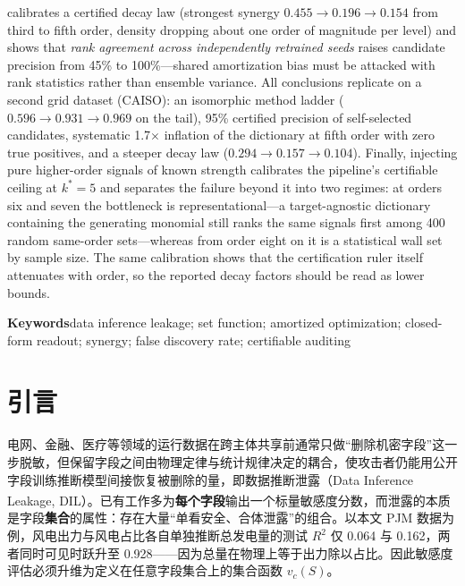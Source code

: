 \documentclass[10.5pt,compsoc,UTF8]{CjC}
\theoremstyle{mystyle}
\newcommand{\upcite}[1]{\textsuperscript{\cite{#1}}}
\newcommand{\Rtwo}{R^{2}}
\begin{document}
{{calibrates a certified decay law (strongest synergy $0.455\to0.196\to0.154$ from third to fifth order, density dropping about one order of magnitude per level) and shows that \emph{rank agreement across independently retrained seeds} raises candidate precision from 45\% to 100\%---shared amortization bias must be attacked with rank statistics rather than ensemble variance. All conclusions replicate on a second grid dataset (CAISO): an isomorphic method ladder ($0.596\to0.931\to0.969$ on the tail), 95\% certified precision of self-selected candidates, systematic 1.7$\times$ inflation of the dictionary at fifth order with zero true positives, and a steeper decay law ($0.294\to0.157\to0.104$). Finally, injecting pure higher-order signals of known strength calibrates the pipeline's certifiable ceiling at $k^\ast=5$ and separates the failure beyond it into two regimes: at orders six and seven the bottleneck is representational---a target-agnostic dictionary containing the generating monomial still ranks the same signals first among 400 random same-order sets---whereas from order eight on it is a statistical wall set by sample size. The same calibration shows that the certification ruler itself attenuates with order, so the reported decay factors should be read as lower bounds.
\par}}
\vspace {5mm}

{{\bf Keywords}\quad data inference leakage; set function; amortized optimization; closed-form readout; synergy; false discovery rate; certifiable auditing\par}

\vskip 10mm

\section{\heiti 引言}

电网、金融、医疗等领域的运行数据在跨主体共享前通常只做“删除机密字段”这一步脱敏，但保留字段之间由物理定律与统计规律决定的耦合，使攻击者仍能用公开字段训练推断模型间接恢复被删除的量，即数据推断泄露（Data Inference Leakage, DIL）\upcite{hu2026ignn}。已有工作多为\textbf{每个字段}输出一个标量敏感度分数，而泄露的本质是字段\textbf{集合}的属性：存在大量“单看安全、合体泄露”的组合。以本文 PJM 数据为例，风电出力与风电占比各自单独推断总发电量的测试 $\Rtwo$ 仅 0.064 与 0.162，两者同时可见时跃升至 0.928——因为总量在物理上等于出力除以占比。因此敏感度评估必须升维为定义在任意字段集合上的集合函数 $v_c(S)$。
\end{document}
